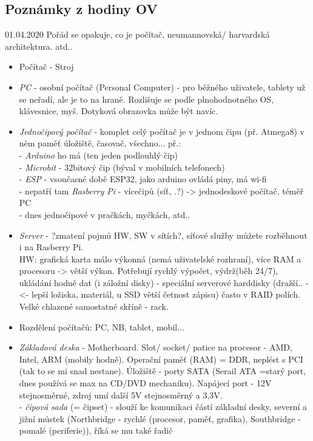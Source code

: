 \documentclass[12pt]{article}
\begin{document}
\subsection{Poznámky z hodiny OV}
01.04.2020
Pořád se opakuje, co je počítač, neumannovská/ harvardská architektura. atd..\\
\begin{itemize}
\item Počítač  - Stroj
\item \emph{PC} - osobní počítač (Personal Computer) - pro běžného uživatele, tablety už se neřadí, ale je to na hraně. Rozlišuje se podle plnohodnotného OS, klávesnice, myš. Dotyková obrazovka může být navíc.
\item \emph{Jednočipový počítač} - komplet celý počítač je v jednom čipu (př. Atmega8) v něm paměť úložiště, časovač, všechno... př.:\\
 - \emph{Arduino} ho má (ten jeden podlouhlý čip)\\
 - \emph{Microbit} - 32bitový čip (býval v mobilních telefonech)\\
 - \emph{ESP} - vsoučasné době ESP32, jako arduino ovládá piny, má wi-fi\\
 - nepatří tam \emph{Rasberry Pi} - vícečipů (síť, .?) -> jednodeskové počítač, téměř PC\\
 - dnes jednočipové v pračkách, myčkách, atd.. 
\item \emph{Server} - ?zmatení pojmů HW, SW v sítích?, síťové služby můžete rozběhnout i na Rasberry Pi. \\ HW: grafická karta málo výkonná (nemá uživatelské rozhraní), více RAM a procesoru -> větší výkon. Potřebují rychlý výpočet, výdrž(běh 24/7), ukládání hodně dat (i záložní disky) - speciální serverové harddisky (dražší.. -<- lepší ložiska, materiál, u SSD větší četnost zápisu)  často v RAID polích. Velké chlazené samostatné skříně - rack.
\item Rozdělení počítačů: PC, NB, tablet, mobil...
\item \emph{Základová deska} - Motherboard. Slot/ socket/ patice na procesor - AMD, Intel, ARM (mobily hodně). Operační paměť (RAM) = DDR, neplést s PCI (tak to se mi snad nestane). Úložiště - porty SATA (Serail ATA  =starý port, dnes používá se max na CD/DVD mechaniku). Napájecí port - 12V stejnosměrné, zdroj umí další 5V stejnosměrný a 3,3V.\\
 - \emph{čipová sada} (= čipset) - slouží ke komunikaci částí základní desky, severní a jižní můstek (Northbridge - rychlé (procesor, paměť, grafika), Southbridge - pomalé (periferie)), říká se mu také řadič\\

\end{itemize}
\end{document}
